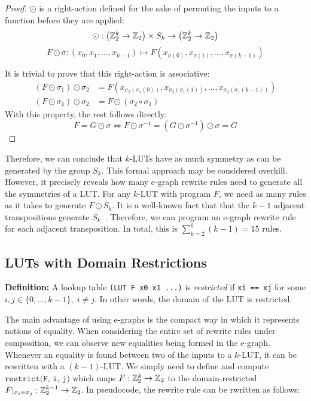 \begin{proof}
    $\odot$ is a right-action defined for the sake of permuting the inputs to a function before they are applied:
    \[ \odot : \big (\mathbb{Z}_{2}^{k} \rightarrow \mathbb{Z}_2 \big ) \times S_k \rightarrow \big (\mathbb{Z}_{2}^{k} \rightarrow \mathbb{Z}_2 \big )\]
    \[ F \odot \sigma : (x_0, x_1, \ldots, x_{k-1}) \mapsto F(x_{\sigma(0)}, x_{\sigma(1)}, \ldots, x_{\sigma(k-1)}) \]

    It is trivial to prove that this right-action is associative:
    \begin{align*}
        (F \odot \sigma_1) \odot \sigma_2 & = F(x_{\sigma_2(\sigma_1(0))}, x_{\sigma_2(\sigma_1(1))}, \ldots, x_{\sigma_2(\sigma_1(k-1))}) \\
        (F \odot \sigma_1) \odot \sigma_2 & = F \odot (\sigma_2 \circ \sigma_1)
    \end{align*}
    With this property, the rest follows directly:
    \[ F = G \odot
        \sigma \iff F \odot \sigma^{-1} = (G \odot \sigma^{-1}) \odot \sigma = G \]
\end{proof}

Therefore, we can conclude that $k$-LUTs have as much symmetry as can be
generated by the group $S_k$. This formal approach may be considered overkill.
However, it precisely reveals how many e-graph rewrite rules need to generate
all the symmetries of a LUT. For any $k$-LUT with program $F$, we need as many
rules as it takes to generate $F \odot S_k$. It is a well-known fact that that
the $k-1$ adjacent transpositions generate $S_k$~\cite{sgroup}. Therefore, we
can program an e-graph rewrite rule for each adjacent transposition. In total,
this is $\sum_{k=2}^{6} (k-1) = 15$ rules.

\subsection{LUTs with Domain Restrictions}\label{sec:rewrites:restrict}

\textbf{Definition:} A lookup table \texttt{(LUT F x0 x1 ...)} is \textit{restricted} if \texttt{xi == xj} for some $ i, j \in \{0, \ldots, k-1\}, \; i \neq j$.
In other words, the domain of the LUT is restricted.

The main advantage of using e-graphs is the compact way in which it represents
notions of equality. When considering the entire set of rewrite rules under
composition, we can observe new equalities being formed in the e-graph.
Whenever an equality is found between two of the inputs to a $k$-LUT, it can be
rewritten with a $(k-1)$-LUT. We simply need to define and compute
$\texttt{restrict(F, i, j)}$ which maps $F : \mathbb{Z}_{2}^{k} \rightarrow \mathbb{Z}_{2}$ to the
domain-restricted $F \vert_{x_i = x_j} : \mathbb{Z}_{2}^{k-1} \rightarrow \mathbb{Z}_{2}$. In
pseudocode, the rewrite rule can be rwritten as follows:

